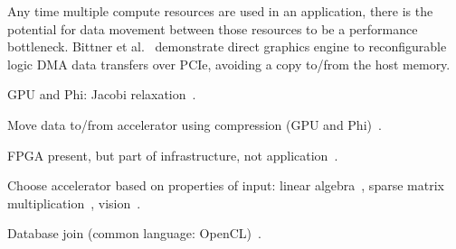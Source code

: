 Any time multiple compute resources are used in an application, there is
the potential for data movement between those resources to be a performance
bottleneck.  Bittner et al.~\cite{brf14} demonstrate direct graphics engine
to reconfigurable logic DMA data transfers over PCIe, avoiding a copy
to/from the host memory.

GPU and Phi:
Jacobi relaxation~\cite{cv16}.

Move data to/from accelerator using compression (GPU and Phi)~\cite{bkp15}.

FPGA present, but part of infrastructure, not application~\cite{abb+13}.

Choose accelerator based on properties of input:
linear algebra~\cite{gchg16,sll+13},
sparse matrix multiplication~\cite{gsbh16},
vision~\cite{mfo+16}.


Database join (common language: OpenCL)~\cite{rl17}.




